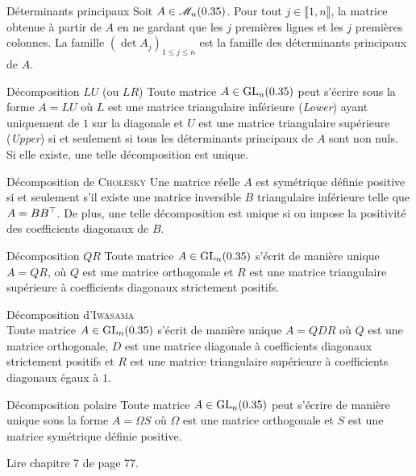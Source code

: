 \begin{defi}{Déterminants principaux}
    Soit $A \in \mathscr{M}_n(0.35)$. Pour tout $j \in \llbracket 1, n \rrbracket$, la matrice obtenue à partir de $A$ en ne gardant que les $j$ premières lignes et les $j$ premières colonnes. La famille $(\det A_j)_{1 \leqslant j \leqslant n}$ est la famille des déterminants principaux de $A$.
\end{defi}


\begin{theo}{Décomposition $LU$ (ou $LR$)}
    Toute matrice $A \in \mathrm{GL}_n(0.35)$ peut s'écrire sous la forme $A = LU$ où $L$ est une matrice triangulaire inférieure (\emph{Lower}) ayant uniquement de $1$ sur la diagonale et $U$ est une matrice triangulaire supérieure (\emph{Upper}) si et seulement si tous les déterminants principaux de $A$ sont non nuls. \\
    Si elle existe, une telle décomposition est unique.
\end{theo}

\begin{theo}{Décomposition de \textsc{Cholesky}}
    Une matrice réelle $A$ est symétrique définie positive si et seulement s'il existe une matrice inversible $B$ triangulaire inférieure telle que $A = B B^\top$. De plus, une telle décomposition est unique si on impose la positivité des coefficients diagonaux de $B$.  
\end{theo}  

\begin{theo}{Décomposition $QR$}
    Toute matrice $A \in \mathrm{GL}_n(0.35)$ s'écrit de manière unique $A = QR$, où $Q$ est une matrice orthogonale et $R$ est une matrice triangulaire supérieure à coefficients diagonaux strictement positifs. 
\end{theo}

\begin{corol}
    Décomposition d'\textsc{Iwasama} \\
    Toute matrice $A \in \mathrm{GL}_n(0.35)$ s'écrit de manière unique $A = QDR$ où $Q$ est une matrice orthogonale, $D$ est une matrice diagonale à coefficients diagonaux strictement positifs et $R$ est une matrice triangulaire supérieure à coefficients diagonaux égaux à $1$. 
\end{corol}

\begin{theo}{Décomposition polaire}
    Toute matrice $A \in \mathrm{GL}_n(0.35)$ peut s'écrire de manière unique sous la forme $A = \Omega S$ où $\Omega$ est une matrice orthogonale et $S$ est une matrice symétrique définie positive. 
\end{theo}
Lire chapitre 7 de \cite{matrices} page 77. \\

